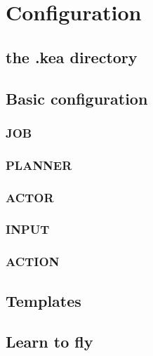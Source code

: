 \chapter{Configuration}

\section{the .kea directory}

\section{Basic configuration}
\subsection{JOB}
\subsection{PLANNER}
\subsection{ACTOR}
\subsection{INPUT}
\subsection{ACTION}
\section{Templates}
\section{Learn to fly}
